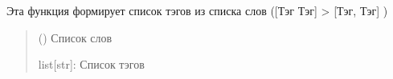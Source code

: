 \documentclass[letterpaper,10pt,russian]{sphinxmanual}
\begin{document}
\begin{fulllineitems}
\label{\detokenize{blueprints:blueprints.function.formation_tags}}
\pysigstartsignatures
{}
\pysigstopsignatures
\sphinxAtStartPar
Эта функция формирует список тэгов из списка слов ({[}Тэг Тэг{]} \sphinxhyphen{}\textgreater{} {[}Тэг, Тэг{]} )
\begin{quote}\begin{description}
\sphinxAtStartPar
{} (\sphinxstyleliteralemphasis{\sphinxupquote{{[}}}\sphinxstyleliteralemphasis{\sphinxupquote{{]}}}) \textendash{} Список слов

\sphinxAtStartPar
list{[}str{]}: Список тэгов

\end{description}\end{quote}

\end{fulllineitems}

\end{document}
